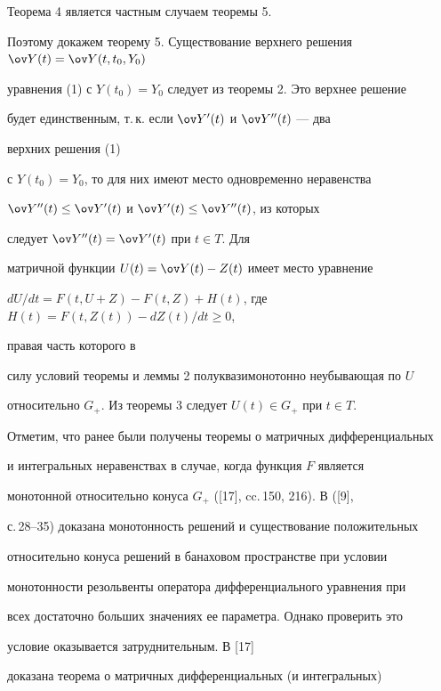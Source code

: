  


\begin{pf} 


Теорема 4 является частным случаем теоремы 5. 


Поэтому докажем теорему 5. Существование верхнего решения $\ov Y(t)=\ov 


Y(t,t_0,Y_0)$ 


уравнения (1) с $Y(t_0)=Y_0$ следует из теоремы 2. Это верхнее решение 


будет единственным, т.\,к. если $\ov Y{}'(t)$ и $\ov Y{}''(t)$ --- два 


верхних решения (1) 


с $Y(t_0)=Y_0$, то для них имеют место одновременно неравенства 


$\ov Y{}''(t)\le\ov Y{}'(t)$ и $\ov Y{}'(t)\le\ov Y{}''(t)$, из которых 


следует $\ov Y{}''(t)=\ov Y{}'(t)$ при $t\in T$. Для 


матричной функции $U(t)=\ov Y(t)-Z(t)$ имеет место уравнение 


$d U/d t=F(t,U+Z)-F(t,Z)+H(t)$, где $H(t)=F(t,Z(t))-d Z(t)/d t\ge0$, 


правая часть которого в 


силу условий теоремы и леммы 2 полуквазимонотонно неубывающая по $U$ 


относительно $G_+$. Из теоремы 3 следует $U(t)\in G_+$ при $t\in T$. 


\end{pf} 


 


Отметим, что ранее были получены теоремы о матричных дифференциальных 


и интегральных неравенствах в случае, когда функция $F$ является 


монотонной относительно конуса $G_+$ ([17], cc.\,150, 216). В ([9], 


с.\,28--35) доказана монотонность решений и существование положительных 


относительно конуса решений в банаховом пространстве при условии 


монотонности резольвенты оператора дифференциального уравнения при 


всех достаточно больших значениях ее параметра. Однако проверить это 


условие оказывается затруднительным. В [17]


доказана теорема о матричных дифференциальных (и интегральных) 


